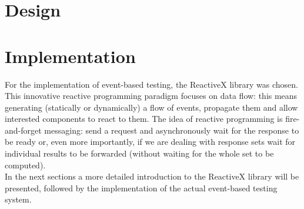 \documentclass[11pt,a4paper,notitlepage]{article}
\begin{document}
\section{Design}


\section{Implementation}

For the implementation of event-based testing, the ReactiveX library was chosen. This innovative reactive programming paradigm focuses on data flow: this means generating (statically or dynamically) a flow of events, propagate them and allow interested components to react to them. The idea of reactive programming is fire-and-forget messaging: send a request and asynchronously wait for the response to be ready or, even more importantly, if we are dealing with response sets wait for individual results to be forwarded (without waiting for the whole set to be computed).\bigskip \\
In the next sections a more detailed introduction to the ReactiveX library will be presented, followed by the implementation of the actual event-based testing system.
\end{document}
